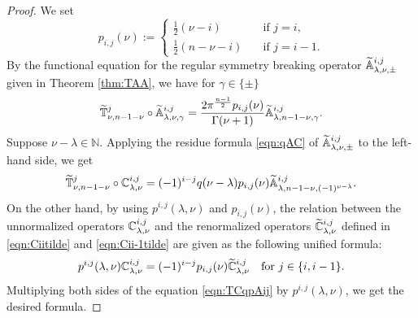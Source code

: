 \begin{proof}
We set
\begin{equation}
\label{eqn:qijnu}
p_{i,j}(\nu)
:=
\begin{cases}
\frac 12(\nu-i) 
\quad
&\text{if $j=i$}, 
\\
\frac 1 2(n-\nu-i)
\quad
&\text{if $j=i-1$}.  
\end{cases}
\end{equation}
By the functional equation 
 for the regular symmetry breaking operator
${\widetilde{\mathbb{A}}}_{{\lambda},{\nu},{\pm}}^{{i,j}}$ 
given in Theorem \ref{thm:TAA}, 
 we have for $\gamma \in \{\pm\}$
\[
  \widetilde{{\mathbb{T}}}_{{\nu},{n-1-\nu}}^{{j}} \circ {\widetilde{\mathbb{A}}}_{{\lambda},{\nu},{\gamma}}^{{i,j}}
= \frac{2 \pi^{\frac{n-1}{2}} p_{i,j}(\nu)}{\Gamma(\nu+1)}
 {\widetilde{\mathbb{A}}}_{{\lambda},{n-1-\nu},{\gamma}}^{{i,j}}.  
\]
Suppose $\nu-\lambda \in {\mathbb{N}}$.  
Applying the residue formula \eqref{eqn:qAC}
 of ${\widetilde{\mathbb{A}}}_{{\lambda},{\nu},{\pm}}^{{i,j}}$ to the left-hand side,
 we get 
\begin{equation}
\label{eqn:TCqpAij}
  \widetilde{{\mathbb{T}}}_{{\nu},{n-1-\nu}}^{{j}} \circ {\mathbb{C}}_{{\lambda},{\nu}}^{{i,j}}
= (-1)^{i-j} q(\nu-\lambda) p_{i,j}(\nu)
  {\widetilde{\mathbb{A}}}_{{\lambda},{n-1-\nu},{(-1)^{\nu-\lambda}}}^{{i,j}}.  
\end{equation}
On the other hand, 
 by using $p^{i,j}(\lambda,\nu)$ and $p_{i,j}(\nu)$, 
 the relation between the unnormalized operators
 ${\mathbb{C}}_{{\lambda},{\nu}}^{{i,j}}$ and 
 the renormalized operators $\widetilde{{\mathbb{C}}}_{{\lambda},{\nu}}^{{i,j}}$
 defined in \eqref{eqn:Ciitilde} and \eqref{eqn:Cii-1tilde}
 are given as the following unified formula:
\[
  p^{i,j}(\lambda,\nu) {\mathbb{C}}_{{\lambda},{\nu}}^{{i,j}} 
 =
  (-1)^{i-j} p_{i,j}(\nu) \widetilde{{\mathbb{C}}}_{{\lambda},{\nu}}^{{i,j}}
  \quad
  \text{for $j \in \{i,i-1\}$.}
\]
Multiplying both sides of the equation \eqref{eqn:TCqpAij}
 by $p^{i,j}(\lambda,\nu)$, 
 we get the desired formula.  
\end{proof}



